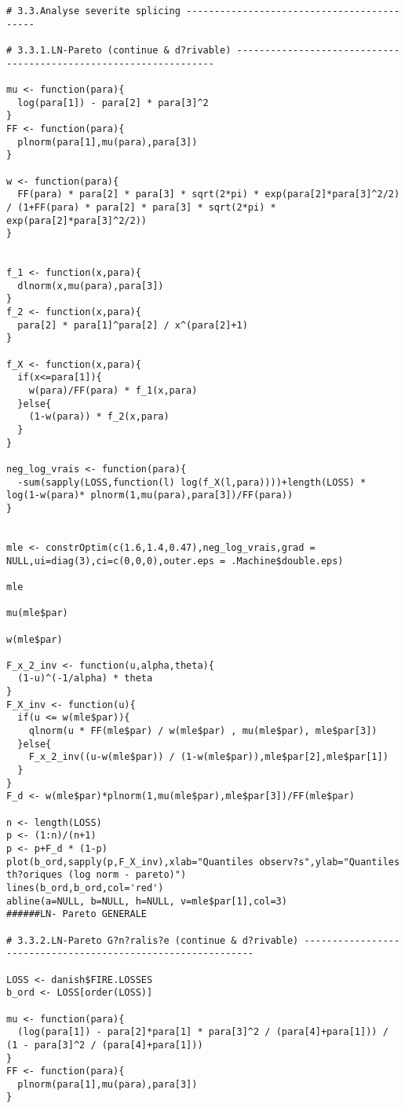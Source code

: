 \begin{verbatim}
# 3.3.Analyse severite splicing -------------------------------------------

# 3.3.1.LN-Pareto (continue & d?rivable) ------------------------------------------------------------------

mu <- function(para){
  log(para[1]) - para[2] * para[3]^2
}
FF <- function(para){
  plnorm(para[1],mu(para),para[3])
}

w <- function(para){
  FF(para) * para[2] * para[3] * sqrt(2*pi) * exp(para[2]*para[3]^2/2) / (1+FF(para) * para[2] * para[3] * sqrt(2*pi) * exp(para[2]*para[3]^2/2))
}


f_1 <- function(x,para){
  dlnorm(x,mu(para),para[3])
}
f_2 <- function(x,para){
  para[2] * para[1]^para[2] / x^(para[2]+1)
}

f_X <- function(x,para){
  if(x<=para[1]){
    w(para)/FF(para) * f_1(x,para)
  }else{
    (1-w(para)) * f_2(x,para)
  } 
}

neg_log_vrais <- function(para){
  -sum(sapply(LOSS,function(l) log(f_X(l,para))))+length(LOSS) * log(1-w(para)* plnorm(1,mu(para),para[3])/FF(para))
}


mle <- constrOptim(c(1.6,1.4,0.47),neg_log_vrais,grad = NULL,ui=diag(3),ci=c(0,0,0),outer.eps = .Machine$double.eps)

mle

mu(mle$par)

w(mle$par)

F_x_2_inv <- function(u,alpha,theta){
  (1-u)^(-1/alpha) * theta
}
F_X_inv <- function(u){
  if(u <= w(mle$par)){
    qlnorm(u * FF(mle$par) / w(mle$par) , mu(mle$par), mle$par[3])
  }else{
    F_x_2_inv((u-w(mle$par)) / (1-w(mle$par)),mle$par[2],mle$par[1])
  }
}
F_d <- w(mle$par)*plnorm(1,mu(mle$par),mle$par[3])/FF(mle$par)

n <- length(LOSS)
p <- (1:n)/(n+1)
p <- p+F_d * (1-p)
plot(b_ord,sapply(p,F_X_inv),xlab="Quantiles observ?s",ylab="Quantiles th?oriques (log norm - pareto)")
lines(b_ord,b_ord,col='red')
abline(a=NULL, b=NULL, h=NULL, v=mle$par[1],col=3)
######LN- Pareto GENERALE

# 3.3.2.LN-Pareto G?n?ralis?e (continue & d?rivable) -------------------------------------------------------------

LOSS <- danish$FIRE.LOSSES
b_ord <- LOSS[order(LOSS)]

mu <- function(para){
  (log(para[1]) - para[2]*para[1] * para[3]^2 / (para[4]+para[1])) / (1 - para[3]^2 / (para[4]+para[1]))
}
FF <- function(para){
  plnorm(para[1],mu(para),para[3])
}


\end{verbatim}
